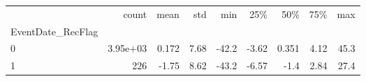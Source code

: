 \begin{tabular}{lrrrrrrrr}
\toprule
 & count & mean & std & min & 25\% & 50\% & 75\% & max \\
EventDate_RecFlag &  &  &  &  &  &  &  &  \\
\midrule
0 & 3.95e+03 & 0.172 & 7.68 & -42.2 & -3.62 & 0.351 & 4.12 & 45.3 \\
1 & 226 & -1.75 & 8.62 & -43.2 & -6.57 & -1.4 & 2.84 & 27.4 \\
\bottomrule
\end{tabular}

